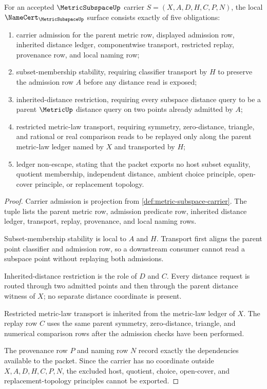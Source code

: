 \begin{theorem}
\label{thm:metric-subspace-namecert-obligations}
For an accepted $\MetricSubspaceUp$ carrier $S=(X,A,D,H,C,P,N)$, the local $\NameCert_{\MetricSubspaceUp}$ surface consists exactly of five obligations:
\begin{enumerate}
\item carrier admission for the parent metric row, displayed admission row, inherited distance ledger, componentwise transport, restricted replay, provenance row, and local naming row;
\item subset-membership stability, requiring classifier transport by $H$ to preserve the admission row $A$ before any distance read is exposed;
\item inherited-distance restriction, requiring every subspace distance query to be a parent $\MetricUp$ distance query on two points already admitted by $A$;
\item restricted metric-law transport, requiring symmetry, zero-distance, triangle, and rational or real comparison reads to be replayed only along the parent metric-law ledger named by $X$ and transported by $H$;
\item ledger non-escape, stating that the packet exports no host subset equality, quotient membership, independent distance, ambient choice principle, open-cover principle, or replacement topology.
\end{enumerate}
\end{theorem}
\begin{proof}
Carrier admission is projection from \autoref{def:metric-subspace-carrier}. The tuple lists the parent metric row, admission predicate row, inherited distance ledger, transport, replay, provenance, and local naming rows.

Subset-membership stability is local to $A$ and $H$. Transport first aligns the parent point classifier and admission row, so a downstream consumer cannot read a subspace point without replaying both admissions.

Inherited-distance restriction is the role of $D$ and $C$. Every distance request is routed through two admitted points and then through the parent distance witness of $X$; no separate distance coordinate is present.

Restricted metric-law transport is inherited from the metric-law ledger of $X$. The replay row $C$ uses the same parent symmetry, zero-distance, triangle, and numerical comparison rows after the admission checks have been performed.

The provenance row $P$ and naming row $N$ record exactly the dependencies available to the packet. Since the carrier has no coordinate outside $X,A,D,H,C,P,N$, the excluded host, quotient, choice, open-cover, and replacement-topology principles cannot be exported.
\end{proof}

